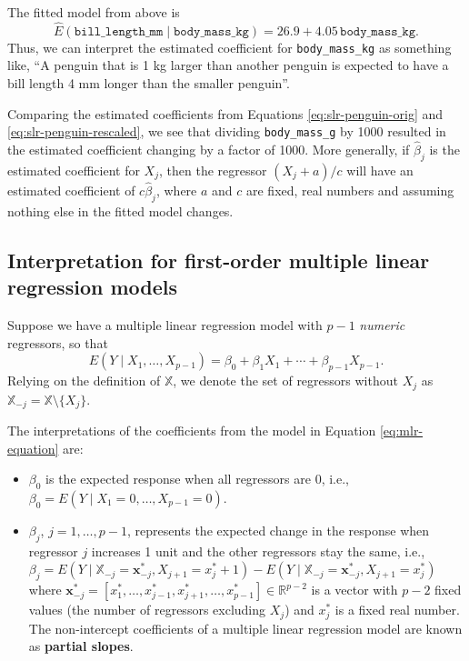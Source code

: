 \documentclass[
]{book}
\providecommand{\tightlist}{%
  \setlength{\itemsep}{0pt}\setlength{\parskip}{0pt}}
\theoremstyle{definition}
\theoremstyle{definition}
\theoremstyle{definition}
\theoremstyle{definition}
\theoremstyle{remark}
\begin{document}
The fitted model from above is \[
\hat{E}(\mathtt{bill\_length\_mm}\mid \mathtt{body\_mass\_kg})=26.9+4.05 \,\mathtt{body\_mass\_kg}.\label{eq:slr-penguin-rescaled}
\] Thus, we can interpret the estimated coefficient for \texttt{body\_mass\_kg}
as something like, ``A penguin that is 1 kg larger than another penguin
is expected to have a bill length 4 mm longer than the smaller penguin''.

Comparing the estimated coefficients from Equations
\eqref{eq:slr-penguin-orig} and \eqref{eq:slr-penguin-rescaled}, we see
that dividing \texttt{body\_mass\_g} by 1000 resulted in the estimated
coefficient changing by a factor of 1000. More generally, if
\(\hat{\beta}_j\) is the estimated coefficient for \(X_j\), then the
regressor \((X_j + a)/c\) will have an estimated coefficient of
\(c\hat{\beta}_j\), where \(a\) and \(c\) are fixed, real numbers and assuming
nothing else in the fitted model changes.

\hypertarget{interp-1st-order-ml}{%
\subsection{Interpretation for first-order multiple linear regression models}\label{interp-1st-order-ml}}

Suppose we have a multiple linear regression model with \(p-1\) \emph{numeric}
regressors, so that \[
E(Y\mid X_1,\ldots,X_{p-1})=\beta_0 + \beta_1 X_1 + \cdots + \beta_{p-1} X_{p-1}.\label{eq:mlr-equation}
\] Relying on the definition of \(\mathbb{X}\), we denote the set of
regressors without \(X_j\) as
\(\mathbb{X}_{-j} = \mathbb{X}\setminus\{X_j\}\).

The interpretations of the coefficients from the model in Equation
\eqref{eq:mlr-equation} are:

\begin{itemize}
\tightlist
\item
  \(\beta_0\) is the expected response when all regressors are 0, i.e.,
  \(\beta_0=E(Y\mid X_1=0,\ldots,X_{p-1}=0)\).
\item
  \(\beta_j\), \(j = 1,\ldots,p-1\), represents the expected change in the
  response when regressor \(j\) increases 1 unit and the other
  regressors stay the same, i.e.,
  \(\beta_j=E(Y\mid \mathbb{X}_{-j} = \mathbf{x}^*_{-j}, X_{j+1} = x_{j}^*+1)-E(Y\mid \mathbb{X}_{-j} = \mathbf{x}^*_{-j}, X_{j+1} = x_{j}^*)\)
  where
  \(\mathbf{x}_{-j}^*=[x^*_1,\ldots,x_{j-1}^*,x_{j+1}^*,\ldots,x_{p-1}^*]\in \mathbb{R}^{p-2}\)
  is a vector with \(p-2\) fixed values (the number of regressors
  excluding \(X_j\)) and \(x_j^*\) is a fixed real number. The
  non-intercept coefficients of a multiple linear regression model are
  known as \textbf{partial slopes}.
\end{itemize}
\end{document}
